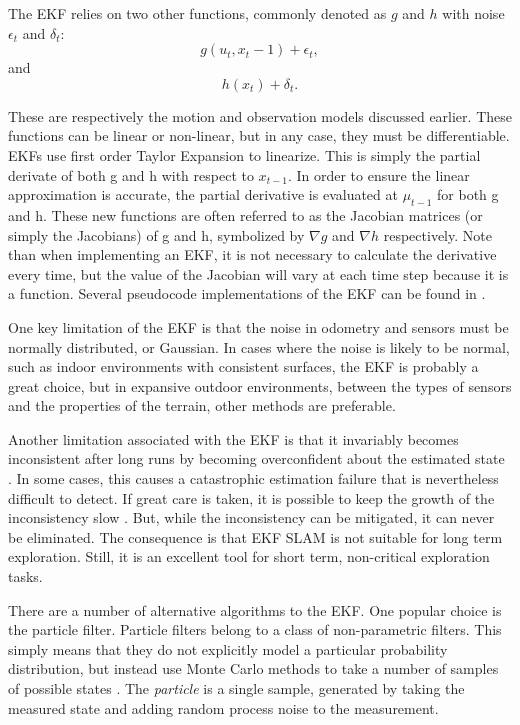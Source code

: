 \documentclass[12pt]{article}
\begin{document}
The EKF relies on two other functions, commonly denoted as $g$ and $h$ with noise $\epsilon_t$ and $\delta_t$:
\begin{equation}\label{g}
g(u_t, x_t-1)+\epsilon_t, 
\end{equation}
and 
\begin{equation}\label{h}
h(x_t)+\delta_t.
\end{equation} 

These are respectively the motion and observation models discussed earlier.  These functions can be linear or non-linear, but in any case, they must be differentiable.  EKFs use first order Taylor Expansion to linearize.  This is simply the partial derivate of both g and h with respect to $x_{t-1}$.  In order to ensure the linear approximation is accurate, the partial derivative is evaluated at $\mu_{t-1}$ for both g and h.  These new functions are often referred to as the Jacobian matrices (or simply the Jacobians) of g and h, symbolized by $\nabla g$ and $\nabla h$ respectively.  Note than when implementing an EKF, it is not necessary to calculate the derivative every time, but the value of the Jacobian will vary at each time step because it is a function.  Several pseudocode implementations of the EKF can be found in \cite{ThrunPR2005}.

One key limitation of the EKF is that the noise in odometry and sensors must be normally distributed, or Gaussian.  In cases where the noise is likely to be normal, such as indoor environments with consistent surfaces, the EKF is probably a great choice, but in expansive outdoor environments, between the types of sensors and the properties of the terrain, other methods are preferable.  

Another limitation associated with the EKF is that it invariably becomes inconsistent after long runs by becoming overconfident about the estimated state \cite{Julier01acounter}.  In some cases, this causes a catastrophic estimation failure that is nevertheless difficult to detect.  If great care is taken, it is possible to keep the growth of the inconsistency slow \cite{BaileyNGSN06}.  But, while the inconsistency can be mitigated, it can never be eliminated.  The consequence is that EKF SLAM is not suitable for long term exploration.  Still, it is an excellent tool for short term, non-critical exploration tasks.

There are a number of alternative algorithms to the EKF.  One popular choice is the particle filter.  Particle filters belong to a class of non-parametric filters.  This simply means that they do not explicitly model a particular probability distribution, but instead use Monte Carlo methods to take a number of samples of possible states \cite{Thrun02d}.   The \emph{particle} is a single sample, generated by taking the measured state and adding random process noise to the measurement.  
\end{document}
